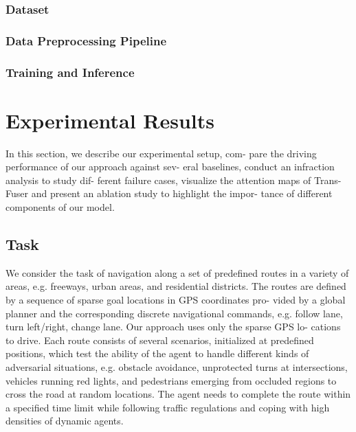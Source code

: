 \documentclass[letterpaper, 12pt]{article}
\theoremstyle{definition}
\theoremstyle{definition}
\theoremstyle{definition}
\theoremstyle{definition}
\theoremstyle{definition}
\begin{document}
\subsubsection{Dataset}
\label{sec:orgda20bae}

\subsubsection{Data Preprocessing Pipeline \label{org28c4336}}
\label{sec:org1a2390d}


\subsubsection{Training and Inference}
\label{sec:orgbc7447e}

\section{Experimental Results \label{org79829d8}}
\label{sec:orge956a23}

In this section, we describe our experimental setup, com-
pare the driving performance of our approach against sev-
eral baselines, conduct an infraction analysis to study dif-
ferent failure cases, visualize the attention maps of Trans-
Fuser and present an ablation study to highlight the impor-
tance of different components of our model.

\subsection{Task}
\label{sec:org0ee386b}
We consider the task of navigation along a set of
predefined routes in a variety of areas, e.g. freeways, urban
areas, and residential districts. The routes are defined by a
sequence of sparse goal locations in GPS coordinates pro-
vided by a global planner and the corresponding discrete
navigational commands, e.g. follow lane, turn left/right,
change lane. Our approach uses only the sparse GPS lo-
cations to drive. Each route consists of several scenarios,
initialized at predefined positions, which test the ability of
the agent to handle different kinds of adversarial situations,
e.g. obstacle avoidance, unprotected turns at intersections,
vehicles running red lights, and pedestrians emerging from
occluded regions to cross the road at random locations. The
agent needs to complete the route within a specified time
limit while following traffic regulations and coping with
high densities of dynamic agents.
\end{document}
